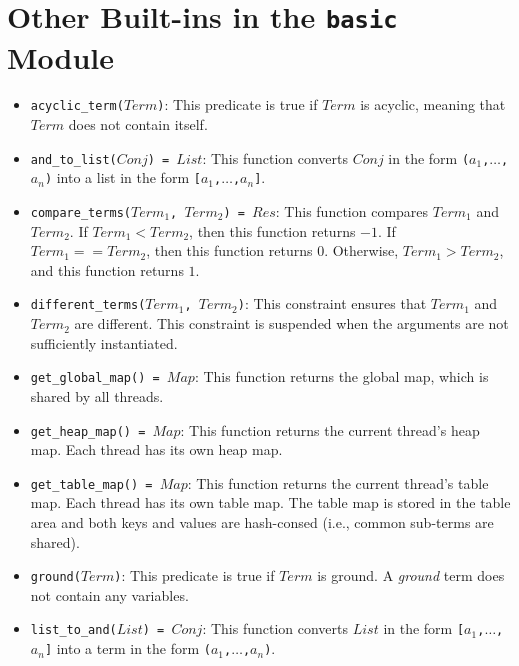\section{\label{sec:otherbuiltins}Other Built-ins in the \texttt{basic} Module}
\begin{itemize}
\item \texttt{acyclic\_term($Term$)}: This predicate is true if $Term$ is acyclic, meaning that $Term$ does not contain itself.
\item \texttt{and\_to\_list($Conj$) = $List$}: This function converts $Conj$ in the form \texttt{($a_1$,$\ldots$,$a_n$)} into a list in the form \texttt{[$a_1$,$\ldots$,$a_n$]}.
\item \texttt{compare\_terms($Term_1$, $Term_2$) = $Res$}:  This function compares $Term_1$ and $Term_2$.  If $Term_1 < Term_2$, then this function returns $-1$.  If $Term_1 == Term_2$, then this function returns $0$.  Otherwise, $Term_1 > Term_2$, and this function returns $1$.
\item \texttt{different\_terms($Term_1$, $Term_2$)}: This constraint ensures that $Term_1$ and $Term_2$ are different. This constraint is suspended when the arguments are not sufficiently instantiated.
\item \texttt{get\_global\_map() = $Map$}: This function returns the global map, which is shared by all threads.
\item \texttt{get\_heap\_map() = $Map$}: This function returns the current thread's heap map.  Each thread has its own heap map. 
\item \texttt{get\_table\_map() = $Map$}: This function returns the current thread's table map.  Each thread has its own table map. The table map is stored in the table area and both keys and values are hash-consed (i.e., common sub-terms are shared).
\item \texttt{ground($Term$)}: This predicate is true if $Term$ is ground.  A \emph{ground} term does not contain any variables.
\item \texttt{list\_to\_and($List$) = $Conj$}: This function converts $List$ in the form \texttt{[$a_1$,$\ldots$,$a_n$]} into a term in the form \texttt{($a_1$,$\ldots$,$a_n$)}.

\end{itemize}
